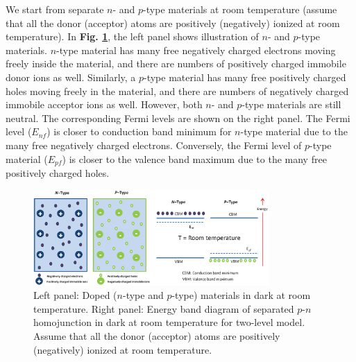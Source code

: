\documentclass[a4paper, 12pt, titlepage,oneside,drop]{kthesis}
\begin{document}
We start from separate $n$- and $p$-type materials at room temperature (assume that all the donor (acceptor) atoms are positively (negatively) ionized at room temperature). In \textbf{Fig. \ref{dopedmaterials}},
the left panel shows illustration of $n$- and $p$-type materials. $n$-type
material has many free negatively charged electrons moving freely inside the material, and there are numbers of positively charged immobile donor ions as well. Similarly, a $p$-type material has many free positively
charged holes moving freely in the material, and there are numbers of negatively charged immobile acceptor ions as well. However, both $n$- and $p$-type materials are still neutral.
The corresponding Fermi levels are shown on the right panel. The Fermi level ($E_{nf}$) is closer to conduction band minimum for $n$-type material due to the many free 
negatively charged electrons. Conversely, the Fermi level of $p$-type material ($E_{pf}$) is closer to the valence band maximum due to the many free positively charged holes.

\begin{figure}[H]
    \begin{center}
            \includegraphics[width=0.8\textwidth,clip]{sepratepn.eps}
     \end{center}
    \caption{Left panel: Doped ($n$-type and $p$-type) materials in dark at room temperature. Right panel: Energy band diagram of separated $p$-$n$ homojunction in dark at room temperature for two-level model. Assume that all the donor (acceptor) atoms are 
    positively (negatively) ionized at room temperature.}      
    \label{dopedmaterials}
\end{figure}
\end{document}
